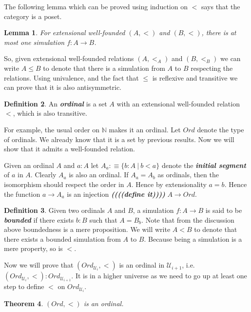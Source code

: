 \documentclass[11pt]{article}
\theoremstyle{definition}
\newtheorem{definition}{Definition}[section]
\theoremstyle{plain}
\newtheorem{theorem}[definition]{Theorem}
\newtheorem{lemma}[definition]{Lemma}
\theoremstyle{remark}
\newcommand{\U}{\mathscr{U}}
\begin{document}
The following lemma which can be proved using induction on $<$ says that the category is a 
poset.

\begin{lemma}\label{L:Sim is uniq}
For extensional well-founded $(A,<)$ and $(B,<)$, there is at most one simulation $f : A \to B$.
\end{lemma}

So, given extensional well-founded relations $(A, <_A)$ and $(B, <_B)$ we can write $A \leq B$ 
to denote that there is a simulation from $A$ to $B$ respecting the relations. Using univalence,
and the fact that $\leq$ is reflexive and transitive we can prove that it is also 
antisymmetric.

\begin{definition}\label{D:Ordinal}
An \textbf{\textit{ordinal}} is a set $A$ with an extensional well-founded relation $<$, which
is also transitive.
\end{definition}

For example, the usual order on $\mathbb{N}$ makes it an ordinal. Let $Ord$ denote the type of
ordinals. We already know that it is a set by previous results. Now we will show that it admits
a well-founded relation.\smallskip

Given an ordinal $A$ and $a : A$ let $A_a :\equiv \{ b : A\ |\ b < a\}$ denote the 
\textbf{\textit{initial segment}} of $a$ in $A$. Clearly $A_a$ is also an ordinal. If 
$A_a = A_b$ as ordinals, then the isomorphism should respect the order in $A$. Hence by 
extensionality $a = b$. Hence the function $a \to A_a$ is an injection
\textbf{\textit{((((define it))))}} $A \to Ord$. 

\begin{definition}\label{D:Bdd sim}
Given two ordinals $A$ and $B$, a simulation $f : A \to B$ is said to be 
\textbf{\textit{bounded}} if there exists $b : B$ such that $A = B_b$. Note that from the
discussion above boundedness is a mere proposition. We will write $A < B$ to denote that 
there exists a bounded simulation from $A$ to $B$. Because being a simulation is a 
mere property, so is $<$.
\end{definition}

Now we will prove that $(Ord_{\U_i},<)$ is an ordinal in $\U_{i+1}$, i.e. 
$(Ord_{\U_i},<) : Ord_{\U_{i+1}}$. It is in a higher universe as we need to go up at least 
one step to define $<$ on $Ord_{\U_i}$.

\begin{theorem}\label{T:Ord is ord}
$(Ord,<)$ is an ordinal.
\end{theorem}
\end{document}
